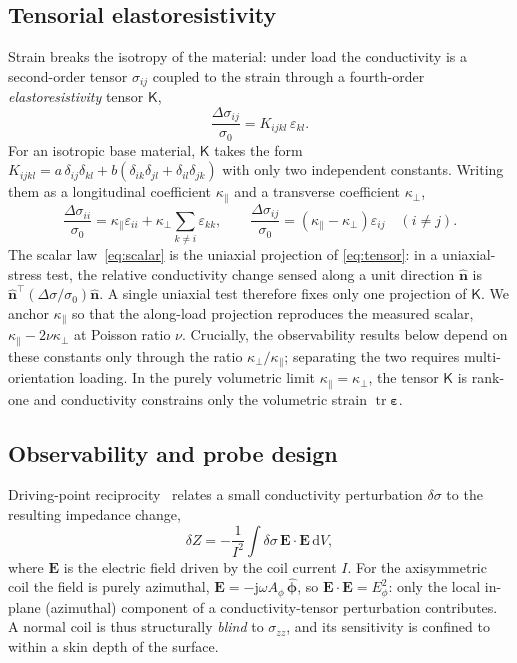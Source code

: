 \documentclass[preprint]{elsarticle}
\newcommand{\dsig}{\Delta\sigma}
\newcommand{\eps}{\bm{\varepsilon}}
\newcommand{\Kt}{\mathsf{K}}
\begin{document}
\subsection{Tensorial elastoresistivity}\label{sec:tensor}
Strain breaks the isotropy of the material: under load the conductivity is a
second-order tensor $\sigma_{ij}$ coupled to the strain through a fourth-order
\emph{elastoresistivity} tensor $\Kt$,
\begin{equation}
  \frac{\dsig_{ij}}{\sigma_0} = K_{ijkl}\,\varepsilon_{kl}.
  \label{eq:tensor}
\end{equation}
For an isotropic base material, $\Kt$ takes the form
$K_{ijkl}=a\,\delta_{ij}\delta_{kl}
+b(\delta_{ik}\delta_{jl}+\delta_{il}\delta_{jk})$ with only two independent
constants. Writing them as a longitudinal coefficient $\kappa_\parallel$ and a
transverse coefficient $\kappa_\perp$,
\begin{equation}
  \frac{\dsig_{ii}}{\sigma_0}=\kappa_\parallel\varepsilon_{ii}
  + \kappa_\perp\!\!\sum_{k\neq i}\varepsilon_{kk}, \qquad
  \frac{\dsig_{ij}}{\sigma_0}=(\kappa_\parallel-\kappa_\perp)\varepsilon_{ij}
  \quad (i\neq j).
  \label{eq:coupling}
\end{equation}
The scalar law~\eqref{eq:scalar} is the uniaxial projection of
\eqref{eq:tensor}: in a uniaxial-stress test, the relative conductivity change
sensed along a unit direction $\hat{\bm n}$ is
$\hat{\bm n}^{\!\top}(\dsig/\sigma_0)\hat{\bm n}$. 
A single uniaxial test therefore fixes only
one projection of $\Kt$. We anchor $\kappa_\parallel$ so that the along-load
projection reproduces the measured scalar,
$\kappa_\parallel-2\nu\kappa_\perp$ at Poisson ratio $\nu$. Crucially,
the observability results below depend on these constants only through the
ratio $\kappa_\perp/\kappa_\parallel$; separating the two requires
multi-orientation loading. In the purely volumetric limit
$\kappa_\parallel=\kappa_\perp$, the tensor $\Kt$ is rank-one and conductivity
constrains only the volumetric strain $\operatorname{tr}\eps$.

\subsection{Observability and probe design}\label{sec:obs}
Driving-point reciprocity~\cite{auld1999} relates a small conductivity
perturbation $\delta\sigma$ to the resulting impedance change,
\begin{equation}
  \delta Z = -\frac{1}{I^2}\int \delta\sigma\,
  \bm E\!\cdot\!\bm E \,\mathrm{d}V ,
  \label{eq:recip}
\end{equation}
where $\bm E$ is the electric field driven by the coil current $I$. For the
axisymmetric coil the field is purely azimuthal,
$\bm E=-\mathrm{j}\omega A_\phi\,\hat{\bm\phi}$, so
$\bm E\!\cdot\!\bm E=E_\phi^2$: only the local in-plane (azimuthal) component
of a conductivity-tensor perturbation contributes. A normal coil is thus
structurally \emph{blind} to $\sigma_{zz}$, and its sensitivity is confined to
within a skin depth of the surface.
\end{document}
